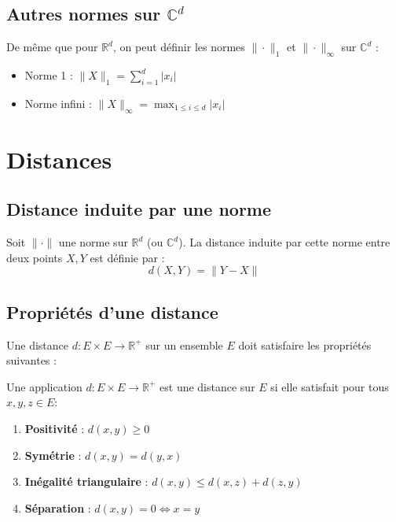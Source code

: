 \subsection{Autres normes sur $\mathbb{C}^d$}

De même que pour $\mathbb{R}^d$, on peut définir les normes $\|\cdot\|_1$ et $\|\cdot\|_\infty$ sur $\mathbb{C}^d$ :
\begin{itemize}
    \item Norme 1 : $\|X\|_1 = \sum_{i=1}^d |x_i|$
    \item Norme infini : $\|X\|_\infty = \max_{1 \leq i \leq d} |x_i|$
\end{itemize}


\section{Distances}

\subsection{Distance induite par une norme}

\begin{definition}
Soit $\|\cdot\|$ une norme sur $\mathbb{R}^d$ (ou $\mathbb{C}^d$). La distance induite par cette norme entre deux points $X, Y$ est définie par :
\[
d(X, Y) = \|Y - X\|
\]
\end{definition}

\subsection{Propriétés d'une distance}

Une distance $d : E \times E \to \mathbb{R}^+$ sur un ensemble $E$ doit satisfaire les propriétés suivantes :

\begin{definition}
Une application $d: E \times E \to \mathbb{R}^+$ est une distance sur $E$ si elle satisfait pour tous $x, y, z \in E$:
\begin{enumerate}
    \item \textbf{Positivité} : $d(x, y) \geq 0$
    \item \textbf{Symétrie} : $d(x, y) = d(y, x)$
    \item \textbf{Inégalité triangulaire} : $d(x, y) \leq d(x, z) + d(z, y)$
    \item \textbf{Séparation} : $d(x, y) = 0 \iff x = y$
\end{enumerate}
\end{definition}

